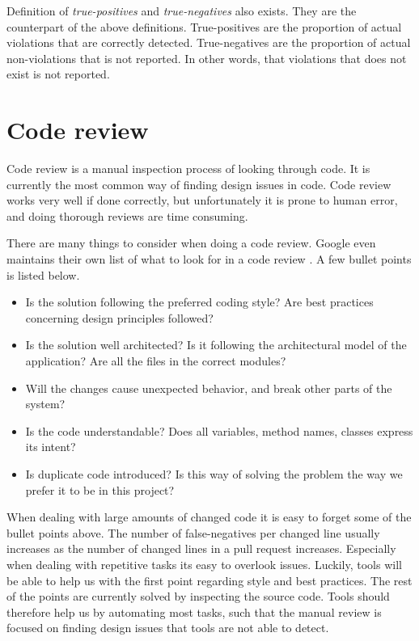 \documentclass{report}
\begin{document}
Definition of \textit{true-positives} and \textit{true-negatives} also exists. They are the counterpart of the above definitions. True-positives are the proportion of actual violations that are correctly detected. True-negatives are the proportion of actual non-violations that is not reported. In other words, that violations that does not exist is not reported. 



\section{Code review}
\label{code-review}
Code review is a manual inspection process of looking through code. It is currently the most common way of finding design issues in code. Code review works very well if done correctly, but unfortunately it is prone to human error, and doing thorough reviews are time consuming.

There are many things to consider when doing a code review. Google even maintains their own list of what to look for in a code review \cite{google-codereview}. A few bullet points is listed below.

\begin{itemize}
    \item Is the solution following the preferred coding style? Are best practices concerning design principles followed?
    
    \item Is the solution well architected? Is it following the architectural model of the application? Are all the files in the correct modules?
    
    \item Will the changes cause unexpected behavior, and break other parts of the system? 
    
    \item Is the code understandable? Does all variables, method names, classes express its intent?
    
     \item Is duplicate code introduced? Is this way of solving the problem the way we prefer it to be in this project?
\end{itemize}

When dealing with large amounts of changed code it is easy to forget some of the bullet points above. The number of false-negatives per changed line usually increases as the number of changed lines in a pull request increases. Especially when dealing with repetitive tasks its easy to overlook issues. Luckily, tools will be able to help us with the first point regarding style and best practices. The rest of the points are currently solved by inspecting the source code. Tools should therefore help us by automating most tasks, such that the manual review is focused on finding design issues that tools are not able to detect. 
\end{document}
